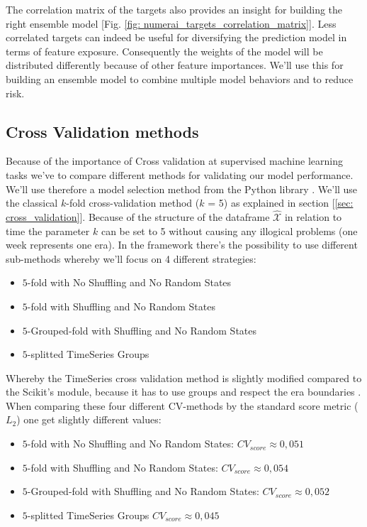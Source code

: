 \documentclass[12pt, a4paper]{article}
\begin{document}
The correlation matrix of the targets also provides an insight for building the right ensemble model [Fig. \ref{fig: numerai_targets_correlation_matrix}]. Less correlated targets can indeed be useful for diversifying the prediction model in terms of feature exposure. Consequently the weights of the model will be distributed differently because of other feature importances. We'll use this for building an ensemble model to combine multiple model behaviors and to reduce risk. \\
\newpage
\subsection{Cross Validation methods}
Because of the importance of Cross validation at supervised machine learning tasks we've to compare different methods for validating our model performance. We'll use therefore a model selection method from the Python library \cite{Scikit2023}. We'll use the classical $k$-fold cross-validation method ($k$ = 5) as explained in section [\ref{sec: cross_validation}]. Because of the structure of the dataframe $\hat{\mathcal{X}}$ in relation to time the parameter $k$ can be set to 5 without causing any illogical problems (one week represents one era). In the framework there's the possibility to use different sub-methods whereby we'll focus on 4 different strategies:
\begin{itemize}
    \item $5$-fold with No Shuffling and No Random States
    \item $5$-fold with Shuffling and No Random States
    \item $5$-Grouped-fold with Shuffling and No Random States
    \item $5$-splitted TimeSeries Groups
\end{itemize}
Whereby the TimeSeries cross validation method is slightly modified compared to the Scikit's module, because it has to use groups and respect the era boundaries \cite{Numerai}.
When comparing these four different CV-methods by the standard score metric ($L_2$) one get slightly different values:
\begin{itemize}
    \item $5$-fold with No Shuffling and No Random States: $CV_{score} \approx 0{,}051$
    \item $5$-fold with Shuffling and No Random States: $CV_{score} \approx 0{,}054$
    \item $5$-Grouped-fold with Shuffling and No Random States: $CV_{score} \approx 0{,}052$
    \item $5$-splitted TimeSeries Groups $CV_{score} \approx 0{,}045$
\end{itemize}
\end{document}
